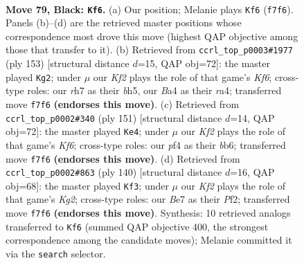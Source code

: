 \documentclass[11pt]{article}
\begin{document}
\clearpage

\begin{figure}[p]\centering
\begin{subfigure}{0.46\textwidth}\centering
\resizebox{\linewidth}{!}{%
\newchessgame
\chessboard[
  setfen={8/4bk1R/P7/5p2/b4P2/8/3r4/6K1 b - - 3 79},
  showmover=false,
  pgfstyle=straightmove, color=movearrow, markmove={f7-f6}
]}
\caption{}
\end{subfigure}\hfill
\begin{subfigure}{0.46\textwidth}\centering
\resizebox{\linewidth}{!}{%
\newchessgame
\chessboard[
  setfen={8/8/1p6/1P1K3B/R7/4bk1n/8/8 b - - 5 77},
  showmover=false,
  pgfstyle=straightmove, color=movearrow, markmove={f3-g2}
]}
\caption{}
\end{subfigure}
\\[4pt]
\begin{subfigure}{0.46\textwidth}\centering
\resizebox{\linewidth}{!}{%
\newchessgame
\chessboard[
  setfen={8/8/1B6/1P6/5b1P/3R1k2/1r6/4K3 b - - 10 76},
  showmover=false,
  pgfstyle=straightmove, color=movearrow, markmove={f3-e4}
]}
\caption{}
\end{subfigure}\hfill
\begin{subfigure}{0.46\textwidth}\centering
\resizebox{\linewidth}{!}{%
\newchessgame
\chessboard[
  setfen={8/3k4/8/3pP3/6r1/8/5PK1/2R5 w - - 0 71},
  showmover=false,
  pgfstyle=straightmove, color=movearrow, markmove={g2-f3}
]}
\caption{}
\end{subfigure}
\caption{\textbf{Move 79, Black: \texttt{Kf6}.} (a) Our position; Melanie plays \texttt{Kf6} (\texttt{f7f6}). Panels (b)--(d) are the retrieved master positions whose correspondence most drove this move (highest QAP objective among those that transfer to it). (b) Retrieved from \texttt{ccrl\_top\_p0003\#1977} (ply 153) [structural distance $d$=15, QAP obj=72]: the master played \texttt{Kg2}; under $\mu$ our \emph{Kf2} plays the role of that game's \emph{Kf6}; cross-type roles: our \emph{r}h7 as their \emph{b}h5, our \emph{B}a4 as their \emph{r}a4; transferred move \texttt{f7f6} \textbf{(endorses this move)}. (c) Retrieved from \texttt{ccrl\_top\_p0002\#340} (ply 151) [structural distance $d$=14, QAP obj=72]: the master played \texttt{Ke4}; under $\mu$ our \emph{Kf2} plays the role of that game's \emph{Kf6}; cross-type roles: our \emph{p}f4 as their \emph{b}b6; transferred move \texttt{f7f6} \textbf{(endorses this move)}. (d) Retrieved from \texttt{ccrl\_top\_p0002\#863} (ply 140) [structural distance $d$=16, QAP obj=68]: the master played \texttt{Kf3}; under $\mu$ our \emph{Kf2} plays the role of that game's \emph{Kg2}; cross-type roles: our \emph{B}e7 as their \emph{P}f2; transferred move \texttt{f7f6} \textbf{(endorses this move)}. Synthesis: 10 retrieved analogs transferred to \texttt{Kf6} (summed QAP objective 400, the strongest correspondence among the candidate moves); Melanie committed it via the \texttt{search} selector.}
\label{fig:thought-m157}
\end{figure}
\end{document}
